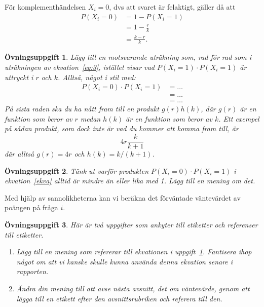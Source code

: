 \documentclass[12pt,a4wide]{article}
\theoremstyle{uppgiftsstil}
\newcommand{\ovningstext}{Övningsuppgift}
\newtheorem{ovning}{\ovningstext}
\newenvironment{uppgift}{\begin{framed}\begin{ovning}}%
                        {\end{ovning}\end{framed}}
\theoremstyle{avklaradstil}
\begin{document}
För komplementhändelsen $X_i = 0$, dvs att svaret är felaktigt, gäller
då att
%
\begin{equation}    %
  \label{eq:3}      %
  \begin{aligned}    
    P(X_i = 0) &= 1 - P(X_i = 1)  \\
               &= 1 - \frac{r}{k}  \\
               &= \frac{k - r}{k}.
  \end{aligned}
\end{equation}
%
\begin{uppgift} \label{uppgiftA}
  Lägg till en motsvarande uträkning som, rad för rad som i
  uträkningen av ekvation~\ref{eq:3}, istället visar vad
  $P(X_i = 1) \cdot P(X_i=1)$ är uttryckt i $r$ och $k$.
  Alltså, något i stil med:
%
  \begin{equation}   
    \label{ekva}
%
    \begin{aligned}    
      P(X_i = 0) \cdot P(X_i = 1) &= \ldots \\ 
                                  &= \ldots \\
                                  &= \ldots 
    \end{aligned}
  \end{equation}
%
  På sista raden ska du ha nått fram till en produkt $g(r)h(k)$, där
  $g(r)$ är en funktion som beror av $r$ medan $h(k)$ är en funktion
  som beror av $k$. Ett exempel på sådan produkt, som dock \emph{inte}
  är vad du kommer att komma fram till, är
%
  \begin{displaymath}
    4r\frac{k}{k + 1}
  \end{displaymath}
%
  där alltså $g(r)=4r$ och $h(k)=k/(k+1)$. 
\end{uppgift}
%
\begin{uppgift}
  Tänk ut varför produkten $ P(X_i = 0) \cdot P(X_i = 1) $ i
  ekvation~\ref{ekva} alltid är mindre än eller lika med 1. Lägg till
  en mening om det.  
\end{uppgift}
%
Med hjälp av sannolikheterna kan vi beräkna det förväntade
väntevärdet av poängen på fråga $i$. 
%
\begin{uppgift}
  Här är två uppgifter som ankyter till etiketter och referenser till
  etiketter.
%  
  \begin{enumerate}
%
    \item Lägg till en mening som refererar till ekvationen i
      uppgift~\ref{uppgiftA}. Fantisera ihop något om att vi
      \emph{kanske} skulle kunna använda denna ekvation senare i
      rapporten. 
%
    \item Ändra din mening till att avse nästa avsnitt, det om
      väntevärde, genom att lägga till en etikett efter den
      avsnittsrubriken och referera till den.  
  \end{enumerate}
%
\end{uppgift}
\end{document}
